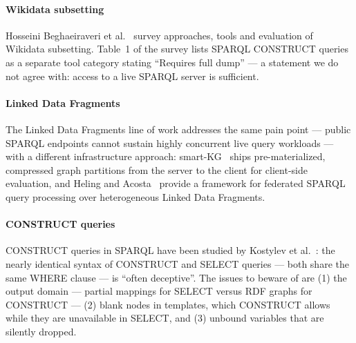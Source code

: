 \documentclass[
]{ceurart}
\newcommand{\tquote}[1]{``#1''}
\begin{document}
\paragraph{Wikidata subsetting}
Hosseini Beghaeiraveri et al.~\cite{hosseini2023subsetting} survey approaches,
tools and evaluation of Wikidata subsetting. Table~1 of the survey lists
SPARQL CONSTRUCT queries as a separate tool category stating \tquote{Requires full
dump} --- a statement we do not agree with: access to a live SPARQL server
is sufficient.

\paragraph{Linked Data Fragments}
The Linked Data Fragments line of work addresses the same pain point --- public SPARQL endpoints cannot sustain highly concurrent live query workloads --- with a different infrastructure approach: smart-KG~\cite{azzam_smartkg_2024} ships pre-materialized, compressed graph partitions from the server to the client for client-side evaluation, and Heling and Acosta~\cite{heling_framework_2021} provide a framework for federated SPARQL query processing over heterogeneous Linked Data Fragments.

\paragraph{CONSTRUCT queries}
CONSTRUCT queries in SPARQL have been studied by Kostylev et al.~\cite{kostylev2015construct}: the nearly identical syntax of CONSTRUCT and SELECT queries --- both share the same WHERE clause --- is \tquote{often deceptive}. The issues to beware of are (1) the output domain --- partial mappings for SELECT versus RDF graphs for CONSTRUCT --- (2) blank nodes in templates, which CONSTRUCT allows while they are unavailable in SELECT, and (3) unbound variables that are silently dropped.

\end{document}

